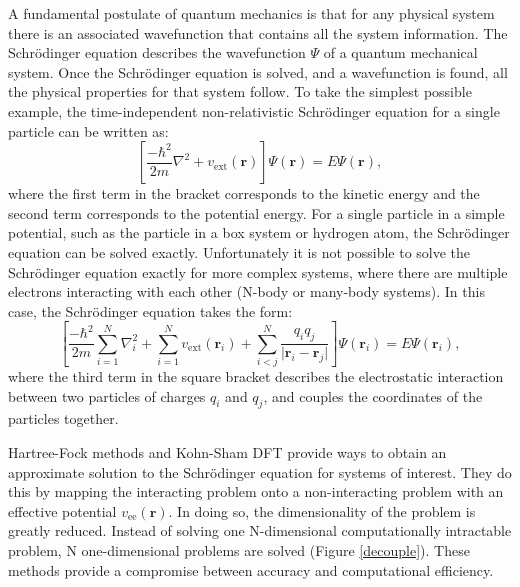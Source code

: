 A fundamental postulate of quantum mechanics is that for any physical system there is an associated wavefunction that contains all the system information.
The Schr\"{o}dinger equation describes the wavefunction $\Psi$ of a quantum mechanical system.  Once the Schr\"{o}dinger equation is solved, and a wavefunction is found, all the physical properties for that system follow. To take the simplest possible example, the time-independent non-relativistic Schr\"{o}dinger equation for a single particle can be written as:
\begin{equation} \label{singleparticle}
\left[\frac{-\hbar^2}{2m}\nabla^2+v_\textrm{ext}(\textbf{r})\right]\Psi(\textbf{r}) = E\Psi(\textbf{r}),
\end{equation}
where the first term in the bracket corresponds to the kinetic energy and the second term corresponds to the potential energy. For a single particle in a simple potential, such as the particle in a box system or hydrogen atom, the Schr\"{o}dinger equation can be solved exactly. Unfortunately it is not possible to solve the Schr\"{o}dinger equation exactly for more complex systems, where there are multiple electrons interacting with each other (N-body or many-body systems). In this case, the Schr\"{o}dinger equation takes the form:
\begin{equation}
\left[\frac{-\hbar^2}{2m}\sum_{i=1}^N\nabla_i^2+\sum_{i=1}^Nv_{\textrm{ext}}(\textbf{r}_i)+\sum_{i<j}^N\frac{q_iq_j}{\lvert\textbf{r}_i-\textbf{r}_j\rvert}\right]\Psi(\textbf{r}_i) = E\Psi(\textbf{r}_i),
\end{equation}
where the third term in the square bracket describes the electrostatic interaction between two particles of charges $q_i$ and $q_j$, and couples the coordinates of the particles together.

Hartree-Fock methods and Kohn-Sham DFT provide ways to obtain an approximate solution to the Schr\"{o}dinger equation for systems of interest. They do this by mapping the interacting problem onto a non-interacting problem with an effective potential $v_\textrm{ee}(\textbf{r})$. In doing so, the dimensionality of the problem is greatly reduced. Instead of solving one N-dimensional computationally intractable problem, N one-dimensional problems are solved (Figure \ref{decouple}). These methods provide a compromise between accuracy and computational efficiency.

